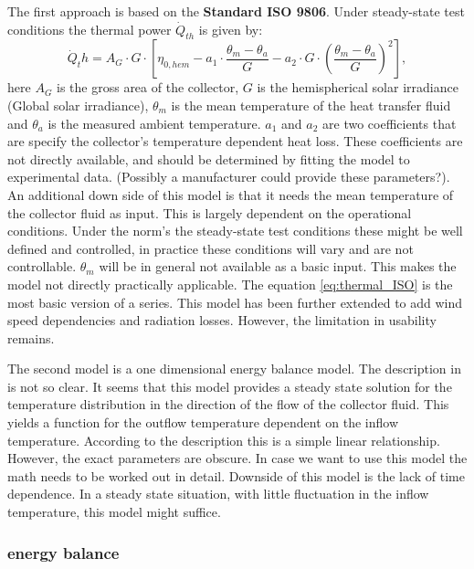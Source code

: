 The first approach is based on the \textbf{Standard ISO 9806}. Under steady-state test conditions the thermal power $\dot{Q}_{th}$ is given by:
\begin{equation}
\dot{Q}_th = A_G\cdot G\cdot \left[\eta_{0,hem} - a_1 \cdot \frac{\theta_m - \theta_a}{G} - a_2 \cdot G \cdot \left(\frac{\theta_m - \theta_a}{G}\right)^2 \right] ,
\label{eq:thermal_ISO}
\end{equation} 
here $A_G$ is the gross area of the collector,  $G$ is the hemispherical solar irradiance (Global solar irradiance), $\theta_m$ is the mean temperature of the heat transfer fluid and $\theta_a$ is the measured ambient temperature. $a_1$ and $a_2$ are two coefficients that are specify the collector's temperature dependent heat loss. These coefficients are not directly available, and should be determined by fitting the model to experimental data. (Possibly a manufacturer could provide these parameters?). An additional down side of this model is that it needs the mean temperature of the collector fluid as input. This is largely dependent on the operational conditions. Under the norm's  the steady-state test conditions these might be well defined and controlled, in practice these conditions will vary and are not controllable. $\theta_m$ will be in general not available as a basic input. This makes the model not directly practically applicable.  
The equation \ref{eq:thermal_ISO} is the most basic version of a series. This model has been further extended to add wind speed dependencies and radiation losses. However, the limitation in usability remains. 


The second model is a one dimensional energy balance model. The description in \cite{SHC2020PVT} is not so clear. It seems that this model provides a steady state solution for the temperature distribution in the direction of the flow of the collector fluid. This yields a function for the outflow temperature dependent on the inflow temperature. According to the description this is a simple linear relationship. However, the exact parameters are obscure. In case we want to use this model the math needs to be worked out in detail. Downside of this model is the lack of time dependence. In a steady state situation, with little fluctuation in the inflow temperature, this model might suffice. 

 
\subsubsection{energy balance}




